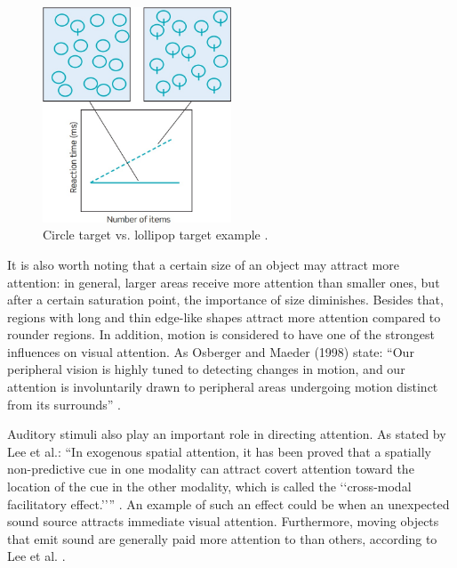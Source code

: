 \begin{figure}[h!]
	\centering
	\includegraphics[width=0.5\textwidth]{figures/circle_lollipop_example.jpg}
	\caption{Circle target vs. lollipop target example \cite{snowden2012basic}.}\label{fig:circle_lollipop_example}
\end{figure}

It is also worth noting that a certain size of an object may attract more attention: in general, larger areas receive more attention than smaller ones, but after a certain saturation point, the importance of size diminishes. Besides that, regions with long and thin edge-like shapes attract more attention compared to rounder regions. In addition, motion is considered to have one of the strongest influences on visual attention. As Osberger and Maeder (1998) state: “Our peripheral vision is highly tuned to detecting changes in motion, and our attention is involuntarily drawn to peripheral areas undergoing motion distinct from its surrounds” \cite{osberger1998automatic}. 

Auditory stimuli also play an important role in directing attention. As stated by Lee et al.: “In exogenous spatial attention, it has been proved that a spatially non-predictive cue in one modality can attract covert attention toward the location of the cue in the other modality, which is called the ‘‘cross-modal facilitatory effect.’’” \cite{Lee2011704}. An example of such an effect could be when an unexpected sound source attracts immediate visual attention. Furthermore, moving objects that emit sound are generally paid more attention to than others, according to Lee et al. \cite{lee2011efficient}.

